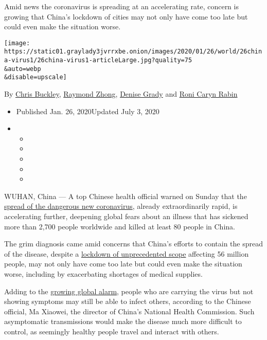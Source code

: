 Amid news the coronavirus is spreading at an accelerating rate, concern
is growing that China's lockdown of cities may not only have come too
late but could even make the situation worse.

\texttt{[image: https://static01.graylady3jvrrxbe.onion/images/2020/01/26/world/26china-virus1/26china-virus1-articleLarge.jpg?quality=75\\\&auto=webp\\\&disable=upscale]}

By \href{https://www.nytimes3xbfgragh.onion/by/chris-buckley}{Chris
Buckley},
\href{https://www.nytimes3xbfgragh.onion/by/raymond-zhong}{Raymond
Zhong}, \href{https://www.nytimes3xbfgragh.onion/by/denise-grady}{Denise
Grady} and
\href{https://www.nytimes3xbfgragh.onion/by/roni-caryn-rabin}{Roni Caryn
Rabin}

\begin{itemize}
\item
  Published Jan. 26, 2020Updated July 3, 2020
\item
  \begin{itemize}
  \item
  \item
  \item
  \item
  \item
  \end{itemize}
\end{itemize}

WUHAN, China --- A top Chinese health official warned on Sunday that the
\href{https://www.nytimes3xbfgragh.onion/2020/01/27/world/asia/china-coronavirus.html}{spread
of the dangerous new coronavirus}, already extraordinarily rapid, is
accelerating further, deepening global fears about an illness that has
sickened more than 2,700 people worldwide and killed at least 80 people
in China.

The grim diagnosis came amid concerns that China's efforts to contain
the spread of the disease, despite a
\href{https://www.nytimes3xbfgragh.onion/2020/01/23/world/asia/china-coronavirus-outbreak.html}{lockdown
of unprecedented scope} affecting 56 million people, may not only have
come too late but could even make the situation worse, including by
exacerbating shortages of medical supplies.

Adding to the
\href{https://www.nytimes3xbfgragh.onion/2020/02/19/world/asia/china-coronavirus.html}{growing
global alarm}, people who are carrying the virus but not showing
symptoms may still be able to infect others, according to the Chinese
official, Ma Xiaowei, the director of China's National Health
Commission. Such asymptomatic transmissions would make the disease much
more difficult to control, as seemingly healthy people travel and
interact with others.

